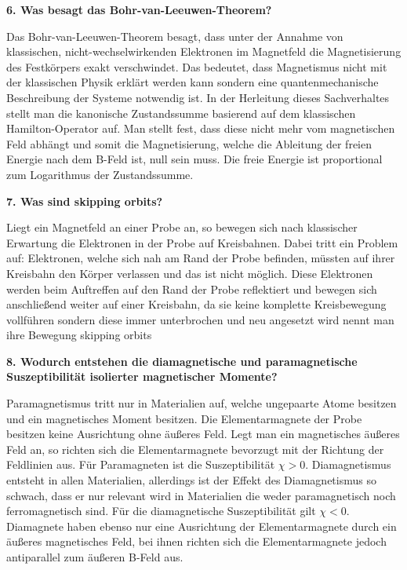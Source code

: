 \noindent\textbf{6. Was besagt das Bohr-van-Leeuwen-Theorem?}\\
\begin{addmargin}[25pt]{0pt}
Das Bohr-van-Leeuwen-Theorem besagt, dass unter der Annahme von klassischen, nicht-wechselwirkenden Elektronen im Magnetfeld die Magnetisierung des Festkörpers exakt verschwindet. Das bedeutet, dass Magnetismus nicht mit der klassischen Physik erklärt werden kann sondern eine quantenmechanische Beschreibung der Systeme notwendig ist. In der Herleitung dieses Sachverhaltes stellt man die kanonische Zustandssumme basierend auf dem klassischen Hamilton-Operator auf. Man stellt fest, dass diese nicht mehr vom magnetischen Feld abhängt und somit die Magnetisierung, welche die Ableitung der freien Energie nach dem B-Feld ist, null sein muss. Die freie Energie ist proportional zum Logarithmus der Zustandssumme.  \\
\end{addmargin}

\noindent\textbf{7. Was sind \glqq skipping orbits\grqq ?}\\
\begin{addmargin}[25pt]{0pt}
Liegt ein Magnetfeld an einer Probe an, so bewegen sich nach klassischer Erwartung die Elektronen in der Probe auf Kreisbahnen. Dabei tritt ein Problem auf: Elektronen, welche sich nah am Rand der Probe befinden, müssten auf ihrer Kreisbahn den Körper verlassen und das ist nicht möglich. Diese Elektronen werden beim Auftreffen auf den Rand der Probe reflektiert und bewegen sich anschließend weiter auf einer Kreisbahn, da sie keine komplette Kreisbewegung vollführen sondern diese immer unterbrochen und neu angesetzt wird nennt man ihre Bewegung \glqq skipping orbits\grqq  \\
\end{addmargin}

\noindent\textbf{8. Wodurch entstehen die diamagnetische und paramagnetische Suszeptibilität isolierter magnetischer Momente?}\\
\begin{addmargin}[25pt]{0pt}
Paramagnetismus tritt nur in Materialien auf, welche ungepaarte Atome besitzen und ein magnetisches Moment besitzen. Die Elementarmagnete der Probe besitzen keine Ausrichtung ohne äußeres Feld. Legt man ein magnetisches äußeres Feld an, so richten sich  die Elementarmagnete bevorzugt mit der Richtung der Feldlinien aus. Für Paramagneten ist die Suszeptibilität $\chi >0$. Diamagnetismus entsteht in allen Materialien, allerdings ist der Effekt des Diamagnetismus so schwach, dass er nur relevant wird in Materialien die weder paramagnetisch noch ferromagnetisch sind. Für die diamagnetische Suszeptibilität gilt $\chi <0$. Diamagnete haben ebenso nur eine Ausrichtung der Elementarmagnete durch ein äußeres magnetisches Feld, bei ihnen richten sich die Elementarmagnete jedoch antiparallel zum äußeren B-Feld aus.\\
\end{addmargin}


